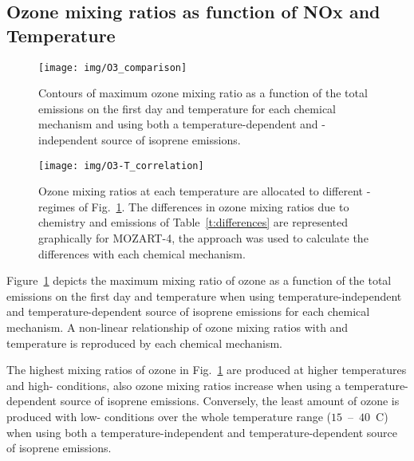 \subsection{Ozone mixing ratios as function of NOx and Temperature} \label{ss:r_contours}

\begin{figure}%
    \centering%
    \caption{Contours of maximum ozone mixing ratio as a function of the total  emissions on the first day and temperature for each chemical mechanism and using both a temperature-dependent and -independent source of isoprene emissions.}
    \label{f:ozone_contours}%
    \texttt{[image: img/O3\_comparison]}%
\end{figure}

\begin{figure}[t]%
    \centering%
    \caption{Ozone mixing ratios at each temperature are allocated to different -regimes of Fig.~\ref{f:ozone_contours}. The differences in ozone mixing ratios due to chemistry and emissions of Table~\ref{t:differences} are represented graphically for MOZART-4, the approach was used to calculate the differences with each chemical mechanism.}%
    \label{f:O3-T}%
    \texttt{[image: img/O3-T\_correlation]}%
\end{figure}

\begin{table}%
    \centering%
    \caption{Increase in ozone mixing ratio (ppbv) due to chemistry and emissions at $40$~\degree C from reference temperature ($20$~\degree C) in the -regimes of Fig.~\ref{f:ozone_contours}.}%
    \label{t:differences}%
\end{table}

Figure~\ref{f:ozone_contours} depicts the maximum mixing ratio of ozone as a function of the total  emissions on the first day and temperature when using temperature-independent and temperature-dependent source of isoprene emissions for each chemical mechanism.
A non-linear relationship of ozone mixing ratios with  and temperature is reproduced by each chemical mechanism.

The highest mixing ratios of ozone in Fig.~\ref{f:ozone_contours} are produced at higher temperatures and high- conditions, also ozone mixing ratios increase when using a temperature-dependent source of isoprene emissions.
Conversely, the least amount of ozone is produced with low- conditions over the whole temperature range ($15$~--~$40$~\degree C) when using both a temperature-independent and temperature-dependent source of isoprene emissions.

